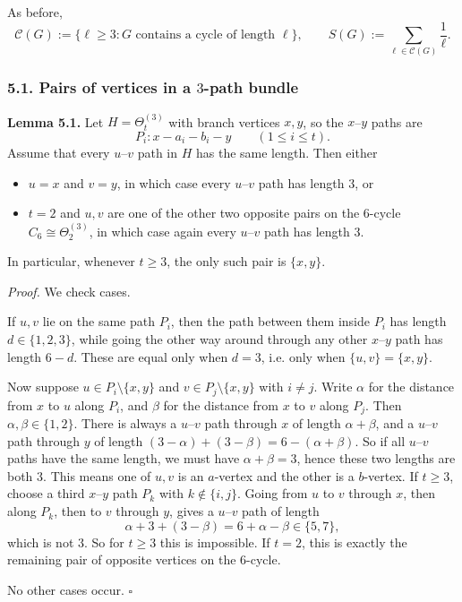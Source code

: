 As before,
\[
\mathcal C(G):=\{\ell\ge 3:\text{$G$ contains a cycle of length $\ell$}\},
\qquad
S(G):=\sum_{\ell\in\mathcal C(G)}\frac1\ell.
\]

\subsubsection*{5.1. Pairs of vertices in a $3$-path bundle}

\textbf{Lemma 5.1.}
Let $H=\Theta_t^{(3)}$ with branch vertices $x,y$, so the $x$--$y$ paths are
\[
P_i: x-a_i-b_i-y\qquad (1\le i\le t).
\]
Assume that every $u$--$v$ path in $H$ has the same length.
Then either
\begin{itemize}
\item $u=x$ and $v=y$, in which case every $u$--$v$ path has length $3$, or
\item $t=2$ and $u,v$ are one of the other two opposite pairs on the $6$-cycle $C_6\cong \Theta_2^{(3)}$, in which case again every $u$--$v$ path has length $3$.
\end{itemize}
In particular, whenever $t\ge 3$, the only such pair is $\{x,y\}$.

\medskip
\textit{Proof.}
We check cases.

If $u,v$ lie on the same path $P_i$, then the path between them inside $P_i$ has length $d\in\{1,2,3\}$, while going the other way around through any other $x$--$y$ path has length $6-d$.
These are equal only when $d=3$, i.e. only when $\{u,v\}=\{x,y\}$.

Now suppose $u\in P_i\setminus\{x,y\}$ and $v\in P_j\setminus\{x,y\}$ with $i\ne j$.
Write $\alpha$ for the distance from $x$ to $u$ along $P_i$, and $\beta$ for the distance from $x$ to $v$ along $P_j$.
Then $\alpha,\beta\in\{1,2\}$.
There is always a $u$--$v$ path through $x$ of length $\alpha+\beta$, and a $u$--$v$ path through $y$ of length $(3-\alpha)+(3-\beta)=6-(\alpha+\beta)$.
So if all $u$--$v$ paths have the same length, we must have $\alpha+\beta=3$, hence these two lengths are both $3$.
This means one of $u,v$ is an $a$-vertex and the other is a $b$-vertex.
If $t\ge 3$, choose a third $x$--$y$ path $P_k$ with $k\notin\{i,j\}$.
Going from $u$ to $v$ through $x$, then along $P_k$, then to $v$ through $y$, gives a $u$--$v$ path of length
\[
\alpha+3+(3-\beta)=6+\alpha-\beta\in\{5,7\},
\]
which is not $3$.
So for $t\ge 3$ this is impossible.
If $t=2$, this is exactly the remaining pair of opposite vertices on the $6$-cycle.

No other cases occur. \hfill$\square$

